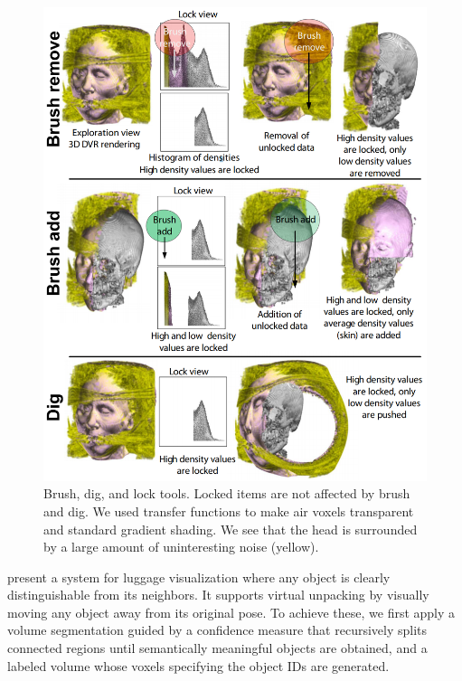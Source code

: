 \begin{figure}
\centering
\includegraphics[width=\textwidth]{Figures/colortunneling}
\decoRule
\caption[ Color Tunneling]{ Brush, dig, and lock tools. Locked items are not affected by
brush and dig. We used transfer functions to make air voxels transparent
and standard gradient shading. We see that the head is surrounded by a
large amount of uninteresting noise (yellow).}
\label{fig:colortunneling}
\end{figure}



\cite{Li:2012:LVV:2425296.2425325} present a system for luggage visualization where any object is
clearly distinguishable from its neighbors. It supports virtual unpacking
by visually moving any object away from its original pose. To achieve these, we first apply a volume segmentation guided by
a confidence measure that recursively splits connected regions until
semantically meaningful objects are obtained, and a labeled volume
whose voxels specifying the object IDs are generated. 

